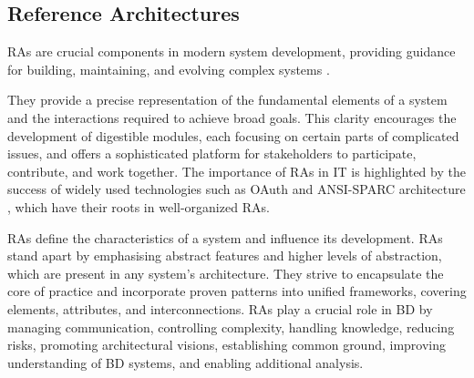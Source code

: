 \documentclass[preprint,12pt]{elsarticle}
\begin{document}


\subsection{Reference Architectures} 

RAs are crucial components in modern system development, providing guidance for building, maintaining, and evolving complex systems \cite{Cloutier2010}. 

They provide a precise representation of the fundamental elements of a system and the interactions required to achieve broad goals. This clarity encourages the development of digestible modules, each focusing on certain parts of complicated issues, and offers a sophisticated platform for stakeholders to participate, contribute, and work together. The importance of RAs in IT is highlighted by the success of widely used technologies such as OAuth \cite{OATH} and ANSI-SPARC architecture \cite{ANSI}, which have their roots in well-organized RAs. 

RAs define the characteristics of a system and influence its development. RAs stand apart by emphasising abstract features and higher levels of abstraction, which are present in any system's architecture. They strive to encapsulate the core of practice and incorporate proven patterns into unified frameworks, covering elements, attributes, and interconnections. RAs play a crucial role in BD by managing communication, controlling complexity, handling knowledge, reducing risks, promoting architectural visions, establishing common ground, improving understanding of BD systems, and enabling additional analysis. 
\end{document}
